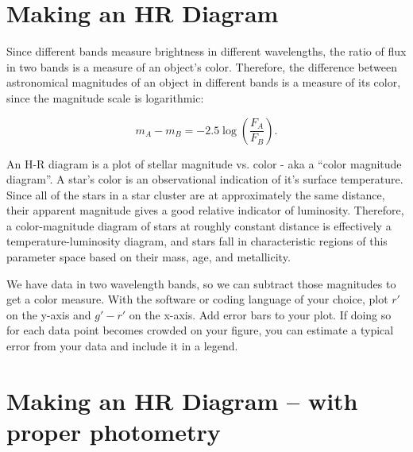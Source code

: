 
\section{Making an HR Diagram}

Since different bands measure brightness in different wavelengths, the ratio of flux in two bands is a measure of an object's color. Therefore, the difference between astronomical magnitudes of an object in different bands is a measure of its color, since the magnitude scale is logarithmic:

\begin{equation}
m_A - m_B = -2.5\log\left(\frac{F_A}{F_B}\right).
\end{equation}

An H-R diagram is a plot of stellar magnitude vs. color - aka a ``color magnitude diagram''. A star's color is an observational indication of it's surface temperature. Since all of the stars in a star cluster are at approximately the same distance, their apparent magnitude gives a good relative indicator of luminosity. Therefore, a color-magnitude diagram of stars at roughly constant distance is effectively a temperature-luminosity diagram, and stars fall in characteristic regions of this parameter space based on their mass, age, and metallicity.

We have data in two wavelength bands, so we can subtract those magnitudes to get a color measure. With the software or coding language of your choice, plot $r'$ on the y-axis and $g' - r'$ on the x-axis. Add error bars to your plot. If doing so for each data point becomes crowded on your figure, you can estimate a typical error from your data and include it in a legend. 

\section{Making an HR Diagram -- with proper photometry}

